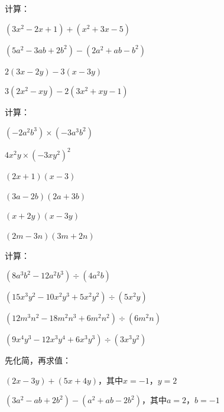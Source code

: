 \documentclass[a4paper,12pt]{ctexart}
\begin{document}
\begin{exercise}
\item 计算：
  \begin{subexercise}
    \item $(3x^2-2x+1)+(x^2+3x-5)$
    \item $(5a^2-3ab+2b^2)-(2a^2+ab-b^2)$
    \item $2(3x-2y)-3(x-3y)$
    \item $3(2x^2-xy)-2(3x^2+xy-1)$
  \end{subexercise}

\item 计算：
  \begin{subexercise}
    \item $(-2a^2b^3)\times(-3a^3b^2)$
    \item $4x^2y\times(-3xy^2)^2$
    \item $(2x+1)(x-3)$
    \item $(3a-2b)(2a+3b)$
    \item $(x+2y)(x-3y)$
    \item $(2m-3n)(3m+2n)$
  \end{subexercise}

\item 计算：
  \begin{subexercise}
    \item $(8a^3b^2-12a^2b^3)\div(4a^2b)$
    \item $(15x^3y^2-10x^2y^3+5x^2y^2)\div(5x^2y)$
    \item $(12m^3n^2-18m^2n^3+6m^2n^2)\div(6m^2n)$
    \item $(9x^4y^3-12x^3y^4+6x^3y^3)\div(3x^3y^2)$
  \end{subexercise}

\item 先化简，再求值：
  \begin{subexercise}
    \item $(2x-3y)+(5x+4y)$，其中$x=-1$，$y=2$
    \item $(3a^2-ab+2b^2)-(a^2+ab-2b^2)$，其中$a=2$，$b=-1$
  \end{subexercise}
\end{exercise}

\newpage


\end{document}
